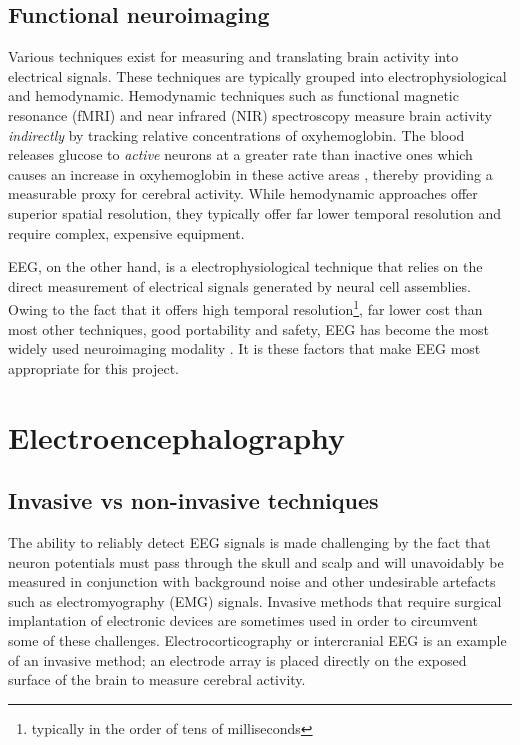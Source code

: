 \subsection{Functional neuroimaging}
Various techniques exist for measuring and translating brain activity into electrical signals. These techniques are typically grouped into electrophysiological and hemodynamic. Hemodynamic techniques such as functional magnetic resonance (fMRI) and near infrared (NIR) spectroscopy measure brain activity \textit{indirectly }by tracking relative concentrations of oxyhemoglobin. The blood releases glucose to \textit{active} neurons at a greater rate than inactive ones which causes an increase in oxyhemoglobin in these active areas \cite{bci-survey-nicolas-alonso}, thereby providing a measurable proxy for cerebral activity. While hemodynamic approaches offer superior spatial resolution, they typically offer far lower temporal resolution and require complex, expensive equipment. 

EEG, on the other hand, is a electrophysiological technique that relies on the direct measurement of electrical signals generated by neural cell assemblies. Owing to the fact that it offers high temporal resolution\footnote{typically in the order of tens of milliseconds}, far lower cost than most other techniques, good portability and safety, EEG has become the most widely used neuroimaging modality \cite{bci-survey-nicolas-alonso}. It is these factors that make EEG most appropriate for this project.

\section{Electroencephalography}

\subsection{Invasive vs non-invasive techniques}

The ability to reliably detect EEG signals is made challenging by the fact that neuron potentials must pass through the skull and scalp and will unavoidably be measured in conjunction with background noise and other undesirable artefacts such as electromyography (EMG) signals. Invasive methods that require surgical implantation of electronic devices are sometimes used in order to circumvent some of these challenges. Electrocorticography or intercranial EEG is an example of an invasive method; an electrode array is placed directly on the exposed surface of the brain to measure cerebral activity. 

